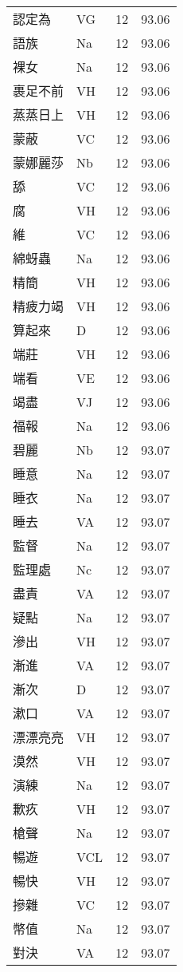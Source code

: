 \documentclass[twocolumn]{book}
\begin{document}
\begin{supertabular}{llrr}
認定為 & VG & 12 &  93.06\\
語族 & Na & 12 &  93.06\\
裸女 & Na & 12 &  93.06\\
裹足不前 & VH & 12 &  93.06\\
蒸蒸日上 & VH & 12 &  93.06\\
蒙蔽 & VC & 12 &  93.06\\
蒙娜麗莎 & Nb & 12 &  93.06\\
舔 & VC & 12 &  93.06\\
腐 & VH & 12 &  93.06\\
維 & VC & 12 &  93.06\\
綿蚜蟲 & Na & 12 &  93.06\\
精簡 & VH & 12 &  93.06\\
精疲力竭 & VH & 12 &  93.06\\
算起來 & D & 12 &  93.06\\
端莊 & VH & 12 &  93.06\\
端看 & VE & 12 &  93.06\\
竭盡 & VJ & 12 &  93.06\\
福報 & Na & 12 &  93.06\\
碧麗 & Nb & 12 &  93.07\\
睡意 & Na & 12 &  93.07\\
睡衣 & Na & 12 &  93.07\\
睡去 & VA & 12 &  93.07\\
監督 & Na & 12 &  93.07\\
監理處 & Nc & 12 &  93.07\\
盡責 & VA & 12 &  93.07\\
疑點 & Na & 12 &  93.07\\
滲出 & VH & 12 &  93.07\\
漸進 & VA & 12 &  93.07\\
漸次 & D & 12 &  93.07\\
漱口 & VA & 12 &  93.07\\
漂漂亮亮 & VH & 12 &  93.07\\
漠然 & VH & 12 &  93.07\\
演練 & Na & 12 &  93.07\\
歉疚 & VH & 12 &  93.07\\
槍聲 & Na & 12 &  93.07\\
暢遊 & VCL & 12 &  93.07\\
暢快 & VH & 12 &  93.07\\
摻雜 & VC & 12 &  93.07\\
幣值 & Na & 12 &  93.07\\
對決 & VA & 12 &  93.07\\

\end{supertabular}
\end{document}
